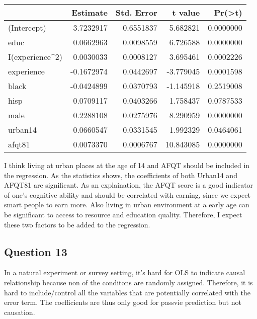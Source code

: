\documentclass[
]{article}
\begin{document}
\begin{longtable}[]{@{}lrrrr@{}}
\toprule
& Estimate & Std. Error & t value &
Pr(\textgreater{}\textbar{}t\textbar{})\tabularnewline
\midrule
\endhead
(Intercept) & 3.7232917 & 0.6551837 & 5.682821 &
0.0000000\tabularnewline
educ & 0.0662963 & 0.0098559 & 6.726588 & 0.0000000\tabularnewline
I(experience\^{}2) & 0.0030033 & 0.0008127 & 3.695461 &
0.0002226\tabularnewline
experience & -0.1672974 & 0.0442697 & -3.779045 &
0.0001598\tabularnewline
black & -0.0424899 & 0.0370793 & -1.145918 & 0.2519008\tabularnewline
hisp & 0.0709117 & 0.0403266 & 1.758437 & 0.0787533\tabularnewline
male & 0.2288108 & 0.0275976 & 8.290959 & 0.0000000\tabularnewline
urban14 & 0.0660547 & 0.0331545 & 1.992329 & 0.0464061\tabularnewline
afqt81 & 0.0073370 & 0.0006767 & 10.843085 & 0.0000000\tabularnewline
\bottomrule
\end{longtable}

I think living at urban places at the age of 14 and AFQT should be
included in the regression. As the statistics shows, the coefficients of
both Urban14 and AFQT81 are significant. As an explaination, the AFQT
score is a good indicator of one's cognitive ability and should be
correlated with earning, since we expect smart people to earn more. Also
living in urban environment at a early age can be significant to access
to resource and education quality. Therefore, I expect these two factors
to be added to the regression.

\hypertarget{question-13}{%
\subsection{Question 13}\label{question-13}}

In a natural experiment or survey setting, it's hard for OLS to indicate
causal relationship because non of the conditons are randomly assigned.
Therefore, it is hard to include/control all the variables that are
potentially correlated with the error term. The coefficients are thus
only good for passvie prediction but not causation.
\end{document}
